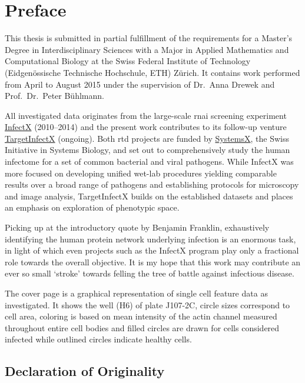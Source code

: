 \chapter{Preface}

This thesis is submitted in partial fulfillment of the requirements for a Master's Degree in Interdisciplinary Sciences with a Major in Applied Mathematics and Computational Biology at the Swiss Federal Institute of Technology (Eidgenössische Technische Hochschule, ETH) Z\"urich. It contains work performed from April to August 2015 under the supervision of Dr.\ Anna Drewek and Prof.\ Dr.\ Peter B\"uhlmann.

All investigated data originates from the large-scale \acrfull{rnai} screening experiment \href{http://www.infectx.ch}{InfectX} (2010--2014) and the present work contributes to its follow-up venture \href{http://www.targetinfectx.ch}{TargetInfectX} (ongoing). Both \acrfull{rtd} projects are funded by \href{http://www.systemsx.ch}{SystemsX}, the Swiss Initiative in Systems Biology, and set out to comprehensively study the human infectome for a set of common bacterial and viral pathogens. While InfectX was more focused on developing unified wet-lab procedures yielding comparable results over a broad range of pathogens and establishing protocols for microscopy and image analysis, TargetInfectX builds on the established datasets and places an emphasis on exploration of phenotypic space.

Picking up at the introductory quote by Benjamin Franklin, exhaustively identifying the human protein network underlying infection is an enormous task, in light of which even projects such as the InfectX program play only a fractional role towards the overall objective. It is my hope that this work may contribute an ever so small `stroke' towards felling the tree of battle against infectious disease.

The cover page is a graphical representation of single cell feature data as investigated. It shows the  well (H6) of plate J107-2C, circle sizes correspond to cell area, coloring is based on mean intensity of the actin channel measured throughout entire cell bodies and filled circles are drawn for cells considered infected while outlined circles indicate healthy cells.

\section*{Declaration of Originality}

